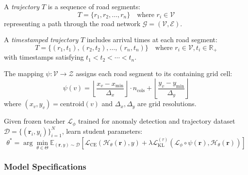 \begin{definition}[Trajectory]
    \label{def:trajectory}
    A \emph{trajectory} $T$ is a sequence of road segments:
    \[
        T = \{r_1, r_2, \ldots, r_n\} \quad \text{where } r_i \in \mathcal{V}
    \]
    representing a path through the road network $\mathcal{G} = (\mathcal{V}, \mathcal{E})$.
\end{definition}

\begin{definition}
    \label{def:trajectory-timestamped}
    A \emph{timestamped trajectory} $T$ includes arrival times at each road segment:
    \[
        T = \{(r_1, t_1), (r_2, t_2), \ldots, (r_n, t_n)\} \quad \text{where } r_i \in \mathcal{V}, t_i \in \mathbb{R}_+
    \]
    with timestamps satisfying $t_1 < t_2 < \cdots < t_n$.
\end{definition}

\begin{definition}
    \label{def:vocab-mapping}
    The mapping $\psi : \mathcal{V} \to \mathcal{Z}$ assigns each road segment to its containing grid cell:
    \begin{equation}
        \psi(v) = \left\lfloor \frac{x_v - x_{\min}}{\Delta_x} \right\rfloor \cdot n_{\text{cols}} +
        \left\lfloor \frac{y_v - y_{\min}}{\Delta_y} \right\rfloor
    \end{equation}
    where $(x_v, y_v) = \text{centroid}(v)$ and $\Delta_x, \Delta_y$ are grid resolutions.
\end{definition}

\begin{definition}
    \label{def:distillation-problem}
    Given frozen teacher $\mathcal{L}_\phi$ trained for anomaly detection and trajectory dataset $\mathcal{D} = \{(\mathbf{r}_i, y_i)\}_{i=1}^N$, learn student parameters:
    \begin{equation}
        \theta^* = \arg\min_{\theta \in \Theta} \mathbb{E}_{(\mathbf{r}, y) \sim \mathcal{D}}
        \left[ \mathcal{L}_{\text{CE}}(\mathcal{H}_\theta(\mathbf{r}), y) +
        \lambda \mathcal{L}_{\text{KL}}^{(\tau)}(\mathcal{L}_\phi \circ \psi(\mathbf{r}), \mathcal{H}_\theta(\mathbf{r})) \right]
    \end{equation}
\end{definition}

\subsubsection{Model Specifications}
\label{sec:method-models}

